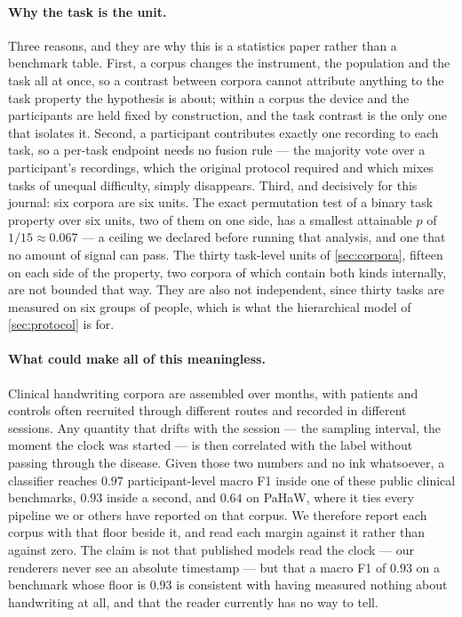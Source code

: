 \paragraph{Why the task is the unit.} Three reasons, and they are why this is a statistics paper
rather than a benchmark table. First, a corpus changes the instrument, the population and the task
all at once, so a contrast between corpora cannot attribute anything to the task property the
hypothesis is about; within a corpus the device and the participants are held fixed by
construction, and the task contrast is the only one that isolates it. Second, a participant
contributes exactly one recording to each task, so a per-task endpoint needs no fusion rule --- the
majority vote over a participant's recordings, which the original protocol required and which mixes
tasks of unequal difficulty, simply disappears. Third, and decisively for this journal: six corpora
are six units. The exact permutation test of a binary task property over six units, two of them on
one side, has a smallest attainable $p$ of $1/15 \approx 0.067$ --- a ceiling we declared before
running that analysis, and one that no amount of signal can pass. The thirty task-level units of
\cref{sec:corpora}, fifteen on each side of the property, two corpora of which contain both kinds
internally, are not bounded that way. They are also not independent, since thirty tasks are
measured on six groups of people, which is what the hierarchical model of \cref{sec:protocol} is
for.

\paragraph{What could make all of this meaningless.} Clinical handwriting corpora are assembled
over months, with patients and controls often recruited through different routes and recorded in
different sessions. Any quantity that drifts with the session --- the sampling interval, the moment
the clock was started --- is then correlated with the label without passing through the disease.
Given those two numbers and no ink whatsoever, a classifier reaches $0.97$ participant-level macro
F1 inside one of these public clinical benchmarks, $0.93$ inside a second, and $0.64$ on PaHaW,
where it ties every pipeline we or others have reported on that corpus. We therefore report each
corpus with that floor beside it, and read each margin against it rather than against zero. The
claim is not that published models read the clock --- our renderers never see an absolute timestamp
--- but that a macro F1 of $0.93$ on a benchmark whose floor is $0.93$ is consistent with having
measured nothing about handwriting at all, and that the reader currently has no way to tell.

